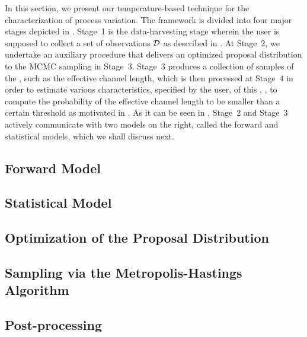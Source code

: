 
In this section, we present our temperature-based technique for the characterization of process variation. The framework is divided into four major stages depicted in .
Stage~1 is the data-harvesting stage wherein the user is supposed to collect a set of observations $\mathcal{D}$ as described in .
At Stage~2, we undertake an auxiliary procedure that delivers an optimized proposal distribution to the MCMC sampling in Stage~3.
Stage~3 produces a collection of samples of the \qoi, such as the effective channel length, which is then processed at Stage~4 in order to estimate various characteristics, specified by the user, of this \qoi, \eg, to compute the probability of the effective channel length to be smaller than a certain threshold as motivated in .
As it can be seen in , Stage~2 and Stage~3 actively communicate with two models on the right, called the forward and statistical models, which we shall discuss next.

\subsection{Forward Model}   


\subsection{Statistical Model} 


\subsection{Optimization of the Proposal Distribution} 


\subsection{Sampling via the Metropolis-Hastings Algorithm} 


\subsection{Post-processing} 

